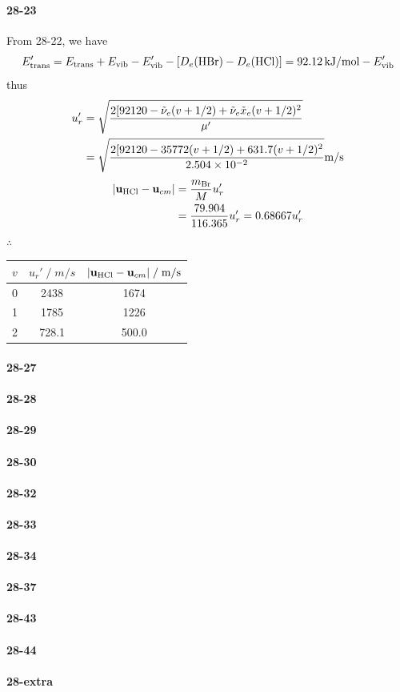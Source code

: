 \documentclass[a4paper]{article}
\newcommand{\ex}[1]{\paragraph{28-#1}}
\numberwithin{equation}{section}
\begin{document}
\ex{23}
From 28-22, we have
\begin{equation}\label{key}
E_{\text{trans}}' = E_{\text{trans}} + E_{\text{vib}} - E_{\text{vib}}' - [ D_e(\ce{HBr}) - D_e(\ce{HCl})] = \SI{92.12}{kJ/mol} - E_{\text{vib}}' 
\end{equation}
thus
\begin{align}\label{key}
u_r' &= \sqrt{\dfrac{2[92120 - \tilde{\nu}_e(v+1/2) + \tilde{\nu}_e\tilde{x}_e(v+1/2)^2}{\mu'}} \notag\\
&= \sqrt{\dfrac{2[92120 - 35772(v+1/2) + 631.7(v+1/2)^2}{\num{2.504e-2}}} \si{m/s}
\end{align}
\begin{align}
\abs{\vb{u}_{\ce{HCl}} - \vb{u}_{cm}} &= \dfrac{m_{\ce{Br}}}{M}u_r' \notag\\
&= \dfrac{79.904}{116.365}u_r' = 0.68667u_r' 
\end{align}
$ \therefore $
\begin{table}[H]
	\centering
	\begin{tabular}{ccc}
		\hline
		$ v $ & $ u_r' \;/\; \si{m/s} $ & $ \abs{\vb{u}_{\ce{HCl}} - \vb{u}_{cm}} \;/\; \si{m/s} $ \\ \hline
		0 & 2438 & 1674 \\
		1 & 1785 & 1226 \\
		2 & 728.1 & 500.0\\ \hline
	\end{tabular}
\end{table}


\ex{27}




\ex{28}



\ex{29}


\ex{30}



\ex{32}



\ex{33}



\ex{34}


\ex{37}


\ex{43}



\ex{44}


\ex{extra}
\end{document}
